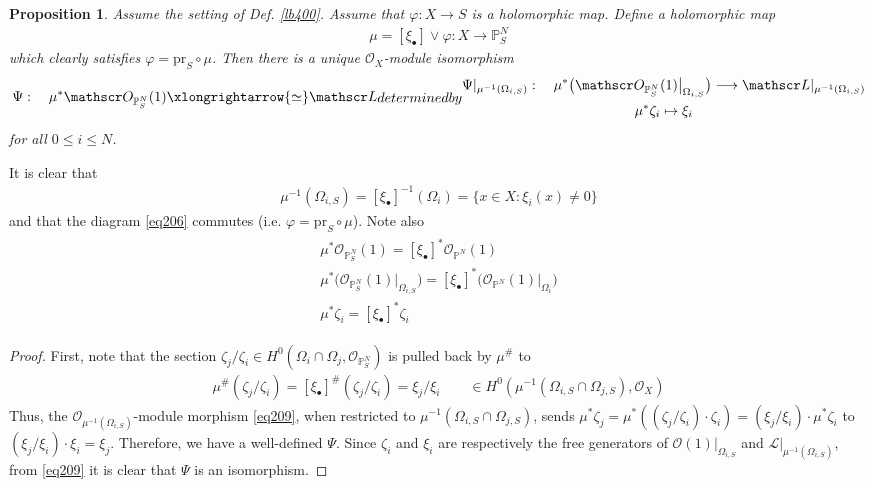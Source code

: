 \documentclass[12pt,b5paper,notitlepage]{report}
\theoremstyle{definition}
\theoremstyle{plain}
\newtheorem{pp}[df]{Proposition}
\newcommand{\scr}{\mathscr}
\newcommand{\blt}{\bullet}
\newcommand{\Pbb}{\mathbb P}
\newcommand{\pr}{\mathrm {pr}}
\numberwithin{equation}{section}
\begin{document}
\begin{pp}\label{lb401}
Assume the setting of Def. \ref{lb400}. Assume that $\varphi:X\rightarrow S$ is a holomorphic map.  Define a holomorphic map
\begin{align}
\mu=[\xi_\blt]\vee\varphi:X\rightarrow \Pbb^N_S\label{eq208}
\end{align}
which clearly satisfies $\varphi=\pr_S\circ\mu$. Then there is a unique $\scr O_X$-module isomorphism 
\begin{subequations}
\begin{gather}
\Psi:\quad\mu^*\scr O_{\Pbb^N_S}(1)\xlongrightarrow{\simeq}\scr L
\end{gather}
determined by
\begin{gather}\label{eq209}
\begin{gathered}
\Psi|_{\mu^{-1}(\Omega_{i,S})}:\quad\mu^*\big(\scr O_{\Pbb^N_S}(1)\big|_{\Omega_{i,S}}\big)\longrightarrow\scr L|_{\mu^{-1}(\Omega_{i,S})}\\
\mu^*\zeta_i\mapsto\xi_i
\end{gathered}
\end{gather}
\end{subequations}
for all $0\leq i\leq N$.
\end{pp}

It is clear that
\begin{align}
\mu^{-1}(\Omega_{i,S})=[\xi_\blt]^{-1}(\Omega_i)=\{x\in X:\xi_i(x)\neq 0\}
\end{align}
and that  the diagram \eqref{eq206} commutes (i.e. $\varphi=\pr_S\circ\mu$). Note also
\begin{gather}
\begin{gathered}
\mu^*\scr O_{\Pbb^N_S}(1)=[\xi_\blt]^*\scr O_{\Pbb^N}(1)\\
\mu^*\big(\scr O_{\Pbb^N_S}(1)\big|_{\Omega_{i,S}}\big)=[\xi_\blt]^*\big(\scr O_{\Pbb^N}(1)\big|_{\Omega_i}\big)\\
\mu^*\zeta_i=[\xi_\blt]^*\zeta_i
\end{gathered}
\end{gather}

\begin{proof}
First, note that the section $\zeta_j/\zeta_i\in H^0(\Omega_i\cap\Omega_j,\scr O_{\Pbb^N_S})$ is pulled back by $\mu^\#$ to
\begin{align}
\mu^\#(\zeta_j/\zeta_i)=[\xi_\blt]^\#(\zeta_j/\zeta_i)=\xi_j/\xi_i\qquad\in H^0(\mu^{-1}(\Omega_{i,S}\cap\Omega_{j,S}),\scr O_X)
\end{align}
Thus, the $\scr O_{\mu^{-1}(\Omega_{i,S})}$-module morphism \eqref{eq209}, when restricted to $\mu^{-1}(\Omega_{i,S}\cap\Omega_{j,S})$, sends $\mu^*\zeta_j=\mu^*((\zeta_j/\zeta_i)\cdot\zeta_i)=(\xi_j/\xi_i)\cdot\mu^*\zeta_i$ to $(\xi_j/\xi_i)\cdot\xi_i=\xi_j$. Therefore, we have a well-defined $\Psi$. Since $\zeta_i$ and $\xi_i$ are respectively the free generators of $\scr O(1)|_{\Omega_{i,S}}$ and $\scr L|_{\mu^{-1}(\Omega_{i,S})}$, from \eqref{eq209} it is clear that $\Psi$ is an isomorphism.
\end{proof}
\end{document}
